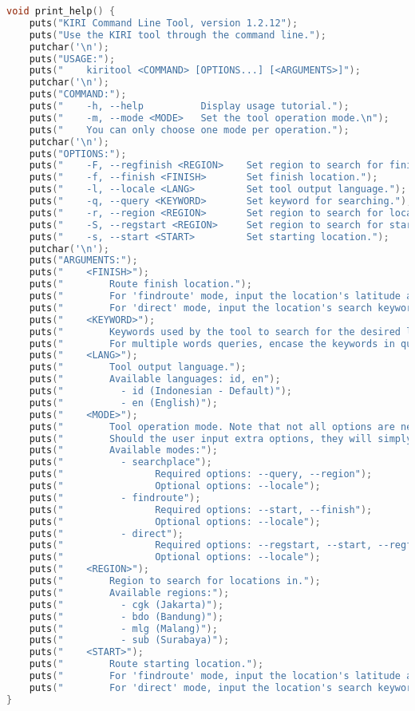 \begin{itemize}[listparindent=\parindent]
	\begin{lstlisting}[language=C, caption=Implementasi fungsi print\textunderscore help(), label=code:kiritool-function-help]
void print_help() {
    puts("KIRI Command Line Tool, version 1.2.12");
    puts("Use the KIRI tool through the command line.");
    putchar('\n');
    puts("USAGE:");
    puts("    kiritool <COMMAND> [OPTIONS...] [<ARGUMENTS>]");
    putchar('\n');
    puts("COMMAND:");
    puts("    -h, --help          Display usage tutorial.");
    puts("    -m, --mode <MODE>   Set the tool operation mode.\n");
    puts("    You can only choose one mode per operation.");
    putchar('\n');
    puts("OPTIONS:");
    puts("    -F, --regfinish <REGION>    Set region to search for finish location in.");
    puts("    -f, --finish <FINISH>       Set finish location.");
    puts("    -l, --locale <LANG>         Set tool output language.");
    puts("    -q, --query <KEYWORD>       Set keyword for searching.");
    puts("    -r, --region <REGION>       Set region to search for location in.");
    puts("    -S, --regstart <REGION>     Set region to search for starting location in.");
    puts("    -s, --start <START>         Set starting location.");
    putchar('\n');
    puts("ARGUMENTS:");
    puts("    <FINISH>");
    puts("        Route finish location.");
    puts("        For 'findroute' mode, input the location's latitude and longitude coordinates.");
    puts("        For 'direct' mode, input the location's search keyword (<KEYWORD> argument).");
    puts("    <KEYWORD>");
    puts("        Keywords used by the tool to search for the desired location.");
    puts("        For multiple words queries, encase the keywords in quotation marks (\" \").");
    puts("    <LANG>");
    puts("        Tool output language.");
    puts("        Available languages: id, en");
    puts("          - id (Indonesian - Default)");
    puts("          - en (English)");
    puts("    <MODE>");
    puts("        Tool operation mode. Note that not all options are needed for all modes.");
    puts("        Should the user input extra options, they will simply not be used.");
    puts("        Available modes:");
    puts("          - searchplace");
    puts("                Required options: --query, --region");
    puts("                Optional options: --locale");
    puts("          - findroute");   
    puts("                Required options: --start, --finish");
    puts("                Optional options: --locale");
    puts("          - direct");   
    puts("                Required options: --regstart, --start, --regfinish, --finish");
    puts("                Optional options: --locale");
    puts("    <REGION>");
    puts("        Region to search for locations in.");
    puts("        Available regions:");
    puts("          - cgk (Jakarta)");
    puts("          - bdo (Bandung)");
    puts("          - mlg (Malang)");
    puts("          - sub (Surabaya)");
    puts("    <START>");
    puts("        Route starting location.");
    puts("        For 'findroute' mode, input the location's latitude and longitude coordinates.");
    puts("        For 'direct' mode, input the location's search keyword (<KEYWORD> argument).");
}
	\end{lstlisting}
	

\end{itemize}

